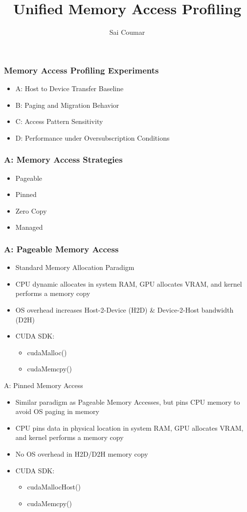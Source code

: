 \documentclass{beamer}
\title{Unified Memory Access Profiling}
\author{Sai Coumar}
\begin{document}
\frame{\titlepage}

\begin{frame}

\frametitle{Memory Access Profiling Experiments}
\begin{itemize}
    \item A: Host to Device Transfer Baseline  
    \item B: Paging and Migration Behavior
    \item C: Access Pattern Sensitivity
    \item D: Performance under Oversubscription Conditions
\end{itemize}

\end{frame}


\begin{frame}
\frametitle{A: Memory Access Strategies}
\begin{itemize}
    \item Pageable 
    \item Pinned 
    \item Zero Copy
    \item Managed 
\end{itemize}

\end{frame}


\begin{frame}
\frametitle{A: Pageable Memory Access}
\begin{itemize}
    \item Standard Memory Allocation Paradigm
    \item CPU dynamic allocates in system RAM, GPU allocates VRAM, and kernel performs a memory copy
    \item OS overhead increases Host-2-Device (H2D) \& Device-2-Host bandwidth (D2H)
    \item CUDA SDK:
        \begin{itemize}
            \item cudaMalloc()
            \item cudaMemcpy()
        \end{itemize}
\end{itemize}

\end{frame}


\begin{frame}{A: Pinned Memory Access}
\begin{itemize}
    \item Similar paradigm as Pageable Memory Accesses, but pins CPU memory to avoid OS paging in memory
    \item CPU pins data in physical location in system RAM, GPU allocates VRAM, and kernel performs a memory copy
    \item No OS overhead in H2D/D2H memory copy
    \item CUDA SDK:
        \begin{itemize}
            \item cudaMallocHost()
            \item cudaMemcpy()
        \end{itemize}
\end{itemize}
\end{frame}
\end{document}
